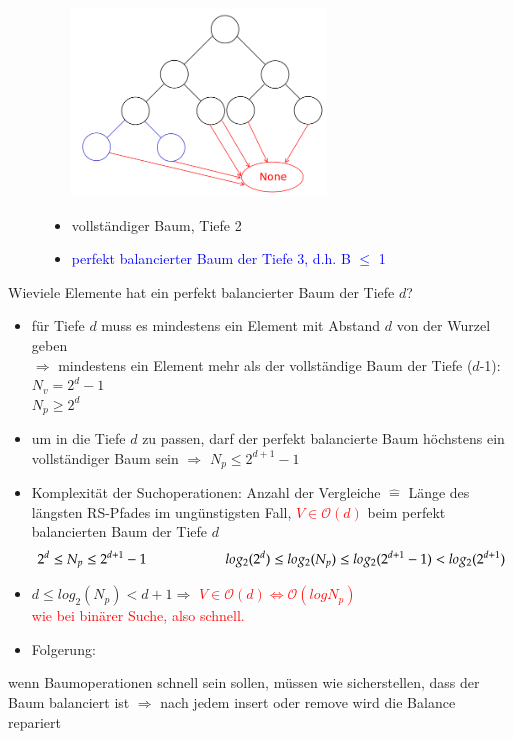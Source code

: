 \documentclass[11pt, fleqn]{scrreprt}
\newcommand{\bigO}[0]{\mathcal{O}}
\begin{document}
\begin{figure}[htbp]
    \begin{minipage}[t]{8cm}
        \vspace{0pt}
        \centering
        \includegraphics[width=8cm,height=5cm,keepaspectratio]{./Pictures/BalanBaum.png}
    \end{minipage}
    \begin{minipage}[t]{6cm}
        \vspace{1cm}
        \begin{itemize}
            \item vollständiger Baum, Tiefe 2
            \item \textcolor{blue}{perfekt balancierter Baum der Tiefe 3, d.h. B $\leq$ 1}
        \end{itemize}
    \end{minipage}
\end{figure}

Wieviele Elemente hat ein perfekt balancierter Baum der Tiefe $d$?
\begin{itemize}
    \item für Tiefe $d$ muss es mindestens ein Element mit Abstand $d$ von der Wurzel geben \\
    $\Rightarrow$ mindestens ein Element mehr als der vollständige Baum der Tiefe ($d$-1): $N_v = 2^d -1$\\
    $N_p \geq 2^d$
    \item um in die Tiefe $d$ zu passen, darf der perfekt balancierte Baum höchstens ein vollständiger Baum sein $\Rightarrow$ $N_p \leq 2^{d+1} -1$
\end{itemize}
\begin{itemize}[label={$\Rightarrow$}]
    \item Komplexität der Suchoperationen: Anzahl der Vergleiche $\widehat{=}$ Länge des längsten RS-Pfades im ungünstigsten Fall, \textcolor{red}{$V \in \bigO{}(d)$} beim perfekt balancierten Baum der Tiefe $d$ \\
    \[ 2^d \leq N_p \leq 2^{d+1} - 1 \hspace*{2cm} log_2(2^d) \leq log_2(N_p) \leq log_2(2^{d+1}-1) < log_2(2^{d+1})\]
    \item $d\leq log_2(N_p) < d + 1 \Rightarrow$ \textcolor{red}{$V \in \bigO{}(d) \Leftrightarrow \bigO{}(log N_p)$}\\
    \textcolor{red}{wie bei binärer Suche, also schnell.}
    \item Folgerung:
\end{itemize}wenn Baumoperationen schnell sein sollen, müssen wie sicherstellen, dass der Baum balanciert ist $\Rightarrow$ nach jedem insert oder remove wird die Balance \glqq repariert\grqq
\end{document}
